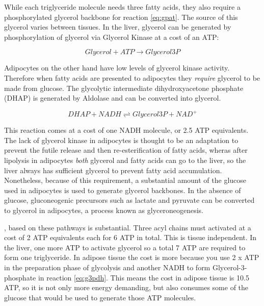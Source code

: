 \documentclass{tufte-handout}
\begin{document}
While each triglyceride molecule needs three fatty acids, they also require a phosphorylated glycerol backbone for reaction \ref{eq:gpat}.  The source of this glycerol varies between tissues.  In the liver, glycerol can be generated by phosphorylation of glycerol via Glycerol Kinase at a cost of an ATP:

\begin{equation}
Glycerol + ATP \rightarrow Glycerol3P
\end{equation}

Adipocytes on the other hand have low levels of glycerol kinase activity.  Therefore when fatty acids are presented to adipocytes they \emph{require} glycerol to be made from glucose.  The glycolytic intermediate dihydroxyacetone phosphate (DHAP) is generated by Aldolase and can be converted into glycerol.

\begin{equation}\label{eq:g3pdh}
DHAP + NADH \rightleftharpoons Glycerol3P + NAD^+
\end{equation}

This reaction comes at a cost of one NADH molecule, or 2.5 ATP equivalents.  The lack of glycerol kinase in adipocytes is thought to be an adaptation to prevent the futile release and then re-esterification of fatty acids, wheras after lipolysis in adipocytes \emph{both} glycerol and fatty acids can go to the liver, so the liver always has sufficient glycerol to prevent fatty acid accumulation.  Nonetheless, because of this requirement, a substantial amount of the glucose used in adipocytes is used to generate glycerol backbones.  In the absence of glucose, gluconeogenic precursors such as lactate and pyruvate can be converted to glycerol in adipocytes, a process known as glyceroneogenesis.

, based on these pathways is substantial.  Three acyl chains must activated at a cost of 2 ATP equivalents each for 6 ATP in total.  This is tissue independent. In the liver, one more ATP to activate glycerol so a total 7 ATP are required to form one triglyceride.  In adipose tissue the cost is more because you use 2 x ATP in the preparation phase of glycolysis and another NADH to form Glycerol-3-phosphate in reaction \ref{eq:g3pdh}.  This means the cost in adipose tissue is 10.5 ATP, so it is not only more energy demanding, but also consumes some of the glucose that would be used to generate those ATP molecules.
\end{document}
